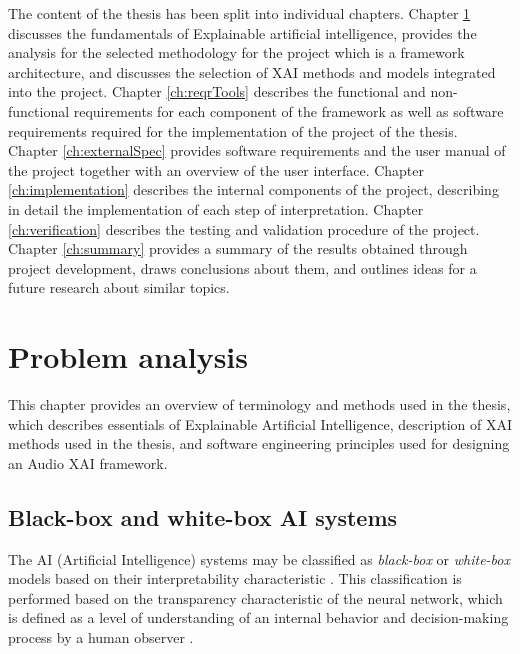 \documentclass[
    bindingoffset=5mm,  %
    footnoteindent=3mm, %
    hyphenation=true    %
]{src/wut-thesis}
\begin{document}
The content of the thesis has been split into individual chapters. Chapter \ref{ch2:probAnalysis} discusses
the fundamentals of Explainable artificial intelligence, provides the analysis for the selected methodology for
the project which is a framework architecture, and discusses the selection of XAI methods and models integrated
into the project. Chapter \ref{ch:reqrTools} describes the functional and non-functional requirements for each
component of the framework as well as software requirements required for the implementation of the project of
the thesis. Chapter \ref{ch:externalSpec} provides software requirements and the user manual of the project
together with an overview of the user interface. Chapter \ref{ch:implementation} describes the internal components of
the project, describing in detail the implementation of each step of interpretation. Chapter \ref{ch:verification}
describes the testing and validation procedure of the project. Chapter \ref{ch:summary} provides a summary
of the results obtained through project development, draws conclusions about them, and outlines ideas for
a future research about similar topics.

%
%
\clearpage %
\section{Problem analysis} \label{ch2:probAnalysis}

This chapter provides an overview of terminology and methods used in the thesis,
which describes essentials of Explainable Artificial Intelligence, description of XAI methods
used in the thesis, and software engineering principles
used for designing an Audio XAI framework.

\subsection{Black-box and white-box AI systems}

The AI (Artificial Intelligence) systems may be classified as \emph{black-box} or \emph{white-box} models
based on their interpretability characteristic \cite{Castelvecchi2016}. This classification is performed based on the
transparency characteristic of the neural network, which is defined as a level of understanding of an internal behavior
and decision-making process by a human observer \cite{Arrieta2019-yr}.
\end{document}

